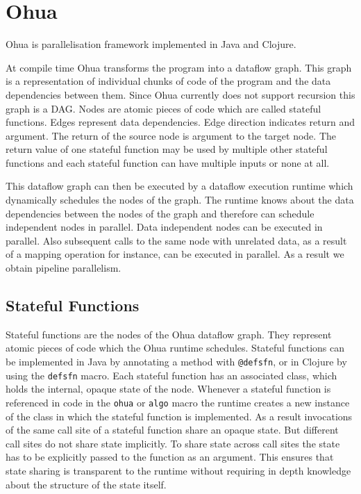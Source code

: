\chapter{Ohua}

\label{ch:Ohua}

Ohua\cite{Ohua:library:link} is parallelisation framework implemented in Java and Clojure.

At compile time Ohua transforms the program into a dataflow graph.
This graph is a representation of individual chunks of code of the program and the data dependencies between them.
Since Ohua currently does not support recursion this graph is a DAG.
Nodes are atomic pieces of code which are called stateful functions.
Edges represent data dependencies.
Edge direction indicates return and argument.
The return of the source node is argument to the target node.
The return value of one stateful function may be used by multiple other stateful functions and each stateful function can have multiple inputs or none at all.

This dataflow graph can then be executed by a dataflow execution runtime which dynamically schedules the nodes of the graph.
The runtime knows about the data dependencies between the nodes of the graph and therefore can schedule independent nodes in parallel.
Data independent nodes can be executed in parallel.
Also subsequent calls to the same node with unrelated data, as a result of a mapping operation for instance, can be executed in parallel.
As a result we obtain pipeline parallelism.


\section{Stateful Functions}


Stateful functions are the nodes of the Ohua dataflow graph.
They represent atomic pieces of code which the Ohua runtime schedules.
Stateful functions can be implemented in Java by annotating a method with \texttt{@defsfn}, or in Clojure by using the \texttt{defsfn} macro.
Each stateful function has an associated class, which holds the internal, opaque state of the node.
Whenever a stateful function is referenced in code in the \texttt{ohua} or \texttt{algo} macro the runtime creates a new instance of the class in which the stateful function is implemented.
As a result invocations of the same call site of a stateful function share an opaque state.
But different call sites do not share state implicitly.
To share state across call sites the state has to be explicitly passed to the function as an argument.
This ensures that state sharing is transparent to the runtime without requiring in depth knowledge about the structure of the state itself.

